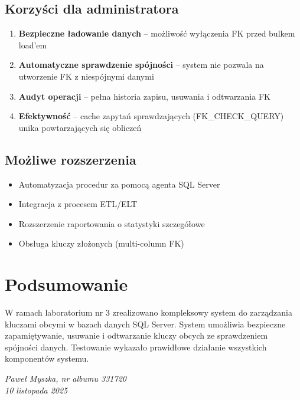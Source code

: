 \documentclass[a4paper,11pt]{article}
\begin{document}
	\subsection{Korzyści dla administratora}
	
	\begin{enumerate}
		\item \textbf{Bezpieczne ładowanie danych} -- możliwość wyłączenia FK przed bulkem load'em
		\item \textbf{Automatyczne sprawdzenie spójności} -- system nie pozwala na utworzenie FK z niespójnymi danymi
		\item \textbf{Audyt operacji} -- pełna historia zapisu, usuwania i odtwarzania FK
		\item \textbf{Efektywność} -- cache zapytań sprawdzających (FK\_CHECK\_QUERY) unika powtarzających się obliczeń
	\end{enumerate}
	
	\subsection{Możliwe rozszerzenia}
	
	\begin{itemize}
		\item Automatyzacja procedur za pomocą agenta SQL Server
		\item Integracja z procesem ETL/ELT
		\item Rozszerzenie raportowania o statystyki szczegółowe
		\item Obsługa kluczy złożonych (multi-column FK)
	\end{itemize}
	
	\section{Podsumowanie}
	
	W ramach laboratorium nr 3 zrealizowano kompleksowy system do zarządzania kluczami obcymi w bazach danych SQL Server. System umożliwia bezpieczne zapamiętywanie, usuwanie i odtwarzanie kluczy obcych ze sprawdzeniem spójności danych. Testowanie wykazało prawidłowe działanie wszystkich komponentów systemu.
	
	\vspace{1.5cm}
	
	\begin{center}
		\textit{Paweł Myszka, nr albumu 331720}\\
		\textit{10 listopada 2025}
	\end{center}
	
\end{document}
